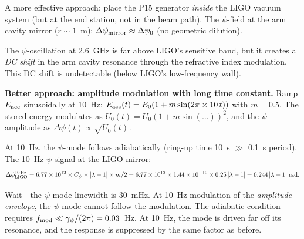 \documentclass[11pt]{article}
\newcommand{\ee}[1]{\times 10^{#1}}
\newcommand{\lam}{\lambda}
\newcommand{\gpsi}{\gamma_\psi}
\begin{document}
A more effective approach: place the P15 generator \textit{inside}
the LIGO vacuum system (but at the end station, not in the beam
path). The $\psi$-field at the arm cavity mirror ($r \sim 1$~m):
$\Delta\psi_{\rm mirror} \approx \Delta\psi_0$ (no geometric dilution).

The $\psi$-oscillation at 2.6~GHz is far above LIGO's sensitive
band, but it creates a \textit{DC shift} in the arm cavity resonance
through the refractive index modulation. This DC shift is
undetectable (below LIGO's low-frequency wall).

\textbf{Better approach: amplitude modulation with long time constant.}
Ramp $E_{\rm acc}$ sinusoidally at 10~Hz: $E_{\rm acc}(t)
= E_0(1 + m\sin(2\pi \times 10\,t))$ with $m = 0.5$.
The stored energy modulates as $U_0(t) = U_0(1 + m\sin(\ldots))^2$,
and the $\psi$-amplitude as $\Delta\psi(t) \propto \sqrt{U_0(t)}$.

At 10~Hz, the $\psi$-mode follows adiabatically (ring-up time
10~s $\gg$ 0.1~s period). The 10~Hz $\psi$-signal at the LIGO
mirror:
\begin{equation}
\Delta\phi_{\rm LIGO}^{\rm 10\,Hz} = 6.77\ee{12} \times C_\psi
\times |\lam-1| \times m/2
= 6.77\ee{12} \times 1.44\ee{-10} \times 0.25\,|\lam-1|
= 0.244\,|\lam-1|\;\text{rad}.
\end{equation}

Wait---the $\psi$-mode linewidth is 30~mHz. At 10~Hz modulation
of the \textit{amplitude envelope}, the $\psi$-mode cannot follow
the modulation. The adiabatic condition requires
$f_{\rm mod} \ll \gpsi/(2\pi) = 0.03$~Hz. At 10~Hz, the mode
is driven far off its resonance, and the response is suppressed
by the same factor as before.
\end{document}
